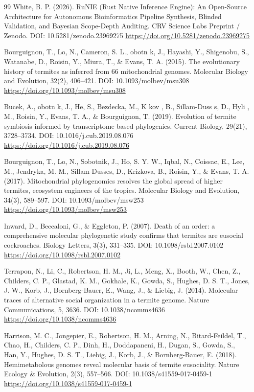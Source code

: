 \documentclass[10pt,letterpaper]{article}
\begin{document}
\begin{thebibliography}{99}
 White, B. P. (2026). RuNIE (Rust Native Inference Engine): An Open-Source Architecture for Autonomous Bioinformatics Pipeline Synthesis, Blinded Validation, and Bayesian Scope-Depth Auditing. CRV Science Labs Preprint / Zenodo. DOI: 10.5281/zenodo.23969275 \url{https://doi.org/10.5281/zenodo.23969275}

 Bourguignon, T., Lo, N., Cameron, S. L.,  obotn k, J., Hayashi, Y., Shigenobu, S., Watanabe, D., Roisin, Y., Miura, T., \& Evans, T. A. (2015). The evolutionary history of termites as inferred from 66 mitochondrial genomes. Molecular Biology and Evolution, 32(2), 406--421. DOI: 10.1093/molbev/msu308 \url{https://doi.org/10.1093/molbev/msu308}

 Bucek, A.,  obotn k, J., He, S., Bezdecka, M., K   kov , B., Sillam-Duss s, D., Hyli , M., Roisin, Y., Evans, T. A., \& Bourguignon, T. (2019). Evolution of termite symbiosis informed by transcriptome-based phylogenies. Current Biology, 29(21), 3728--3734. DOI: 10.1016/j.cub.2019.08.076 \url{https://doi.org/10.1016/j.cub.2019.08.076}

 Bourguignon, T., Lo, N., Sobotnik, J., Ho, S. Y. W., Iqbal, N., Coissac, E., Lee, M., Jendryka, M. M., Sillam-Dusses, D., Krizkova, B., Roisin, Y., \& Evans, T. A. (2017). Mitochondrial phylogenomics resolves the global spread of higher termites, ecosystem engineers of the tropics. Molecular Biology and Evolution, 34(3), 589--597. DOI: 10.1093/molbev/msw253 \url{https://doi.org/10.1093/molbev/msw253}

 Inward, D., Beccaloni, G., \& Eggleton, P. (2007). Death of an order: a comprehensive molecular phylogenetic study confirms that termites are eusocial cockroaches. Biology Letters, 3(3), 331--335. DOI: 10.1098/rsbl.2007.0102 \url{https://doi.org/10.1098/rsbl.2007.0102}

 Terrapon, N., Li, C., Robertson, H. M., Ji, L., Meng, X., Booth, W., Chen, Z., Childers, C. P., Glastad, K. M., Gokhale, K., Gowda, S., Hughes, D. S. T., Jones, J. W., Korb, J., Bornberg-Bauer, E., Wang, J., \& Liebig, J. (2014). Molecular traces of alternative social organization in a termite genome. Nature Communications, 5, 3636. DOI: 10.1038/ncomms4636 \url{https://doi.org/10.1038/ncomms4636}

 Harrison, M. C., Jongepier, E., Robertson, H. M., Arning, N., Bitard-Feildel, T., Chao, H., Childers, C. P., Dinh, H., Doddapaneni, H., Dugan, S., Gowda, S., Han, Y., Hughes, D. S. T., Liebig, J., Korb, J., \& Bornberg-Bauer, E. (2018). Hemimetabolous genomes reveal molecular basis of termite eusociality. Nature Ecology \& Evolution, 2(3), 557--566. DOI: 10.1038/s41559-017-0459-1 \url{https://doi.org/10.1038/s41559-017-0459-1}


\end{thebibliography}
\end{document}
